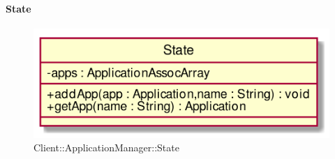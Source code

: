 \hypertarget{State_label}{\paragraph{State}}
\begin{figure}[h]
	\centering
	\includegraphics[width=\textwidth,height=\textheight,keepaspectratio]{images/ClassState.png}
	\caption{Client::ApplicationManager::State}
\end{figure}
